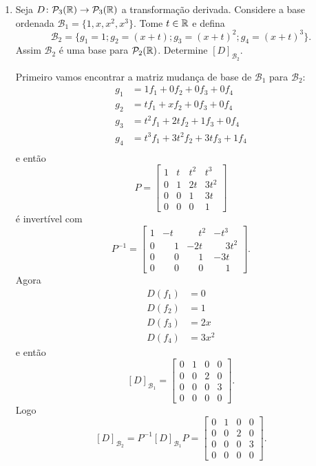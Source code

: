 \begin{exemplos}
\begin{enumerate}[label={\arabic*})]
    \item Seja $D \colon \mathcal{P}_3(\mathbb{R}) \to \mathcal{P}_3(\mathbb{R})$ a transformação derivada. Considere a base ordenada $\mathcal{B}_1 = \{1, x, x^2, x^3\}$. Tome $t \in \mathbb{R}$ e defina
    \[
      \mathcal{B}_2 = \{g_1 = 1; g_2 = (x + t); g_3 = (x + t)^2; g_4 = (x + t)^3\}.
    \]
    Assim $\mathcal{B}_2$ é uma base para $\mathcal{P}_2(\mathbb{R})$. Determine $[D]_{\mathcal{B}_2}$.
    \begin{solucao}
      Primeiro vamos encontrar a matriz mudança de base de $\mathcal{B}_1$ para $\mathcal{B}_2$:
      \begin{align*}
        g_1 &= 1f_1 + 0f_2 + 0f_3 + 0f_4\\
        g_2 &= tf_1 + xf_2 + 0f_3 + 0f_4\\
        g_3 &= t^2f_1 + 2tf_2 + 1f_3 + 0f_4\\
        g_4 &= t^3f_1 + 3t^2f_2 + 3tf_3 + 1f_4\\
      \end{align*}
      e então
      \[
        P = \begin{bmatrix}
          1 & t & t^2 & t^3\\
          0 & 1 & 2t & 3t^2\\
          0 & 0 & 1 & 3t\\
          0 & 0 & 0 & 1
        \end{bmatrix}
      \]
      é invertível com
      \[
        P^{-1} = \begin{bmatrix}
          1 & -t & \phantom{-}t^2 & -t^3\\
          0 & \phantom{-}1 & -2t & \phantom{-}3t^2\\
          0 & \phantom{-}0 & \phantom{-}1 & -3t\\
          0 & \phantom{-}0 & \phantom{-}0 & \phantom{-}1
        \end{bmatrix}.
      \]
      Agora
      \begin{align*}
        D(f_1) &= 0\\
        D(f_2) &= 1\\
        D(f_3) &= 2x\\
        D(f_4) &= 3x^2
      \end{align*}
      e então
      \[
        [D]_{\mathcal{B}_1} = \begin{bmatrix}
          0 & 1 & 0 & 0\\
          0 & 0 & 2 & 0\\
          0 & 0 & 0 & 3\\
          0 & 0 & 0 & 0
        \end{bmatrix}.
      \]
      Logo
      \[
        [D]_{\mathcal{B}_2} = P^{-1}[D]_{\mathcal{B}_1}P = \begin{bmatrix}
          0 & 1 & 0 & 0\\
          0 & 0 & 2 & 0\\
          0 & 0 & 0 & 3\\
          0 & 0 & 0 & 0
        \end{bmatrix}.
      \]
    \end{solucao}
  \end{enumerate}
\end{exemplos}

